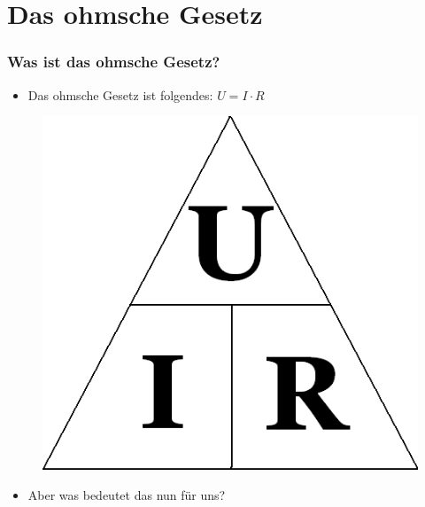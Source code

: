 

\subtitle{Technik Klasse E 03 \\
          Ohmsches Gesetz, Leistung \& Arbeit \\[2em]}
\date{Stand 27.10.2016}



\section{Das ohmsche Gesetz}

\begin{frame}
  \frametitle{Was ist das ohmsche Gesetz?}
  \begin{itemize}
    \item Das ohmsche Gesetz ist folgendes: $U = I \cdot R$
  \end{itemize}
  \begin{center}
    \begin{figure}
      \includegraphics[width=\textwidth,height=.7\textheight,keepaspectratio]{e03/Ohm_law_triangle.png}
    \end{figure}
 	\end{center}
 	\begin{itemize}
 		\item	Aber was bedeutet das nun für uns?
 	\end{itemize}
\end{frame}

